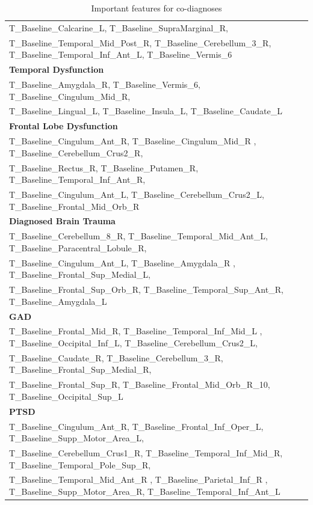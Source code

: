\documentclass[9pt]{article}
\begin{document}
\begin{table}[h!]
\begin{small}
\begin{tabular}{|l|}
 T\_Baseline\_Calcarine\_L,          T\_Baseline\_SupraMarginal\_R,\\     
T\_Baseline\_Temporal\_Mid\_Post\_R,  T\_Baseline\_Cerebellum\_3\_R,      
T\_Baseline\_Temporal\_Inf\_Ant\_L,   T\_Baseline\_Vermis\_6\\        \hline    
\textbf{ Temporal Dysfunction}\\\hline
 T\_Baseline\_Amygdala\_R,  T\_Baseline\_Vermis\_6,      
 T\_Baseline\_Cingulum\_Mid\_R,\\ T\_Baseline\_Lingual\_L, T\_Baseline\_Insula\_L, T\_Baseline\_Caudate\_L\\ \hline
\textbf{Frontal Lobe Dysfunction}\\\hline
 T\_Baseline\_Cingulum\_Ant\_R,    T\_Baseline\_Cingulum\_Mid\_R ,    T\_Baseline\_Cerebellum\_Crus2\_R,\\
 T\_Baseline\_Rectus\_R, T\_Baseline\_Putamen\_R,         
 T\_Baseline\_Temporal\_Inf\_Ant\_R,\\ T\_Baseline\_Cingulum\_Ant\_L,     T\_Baseline\_Cerebellum\_Crus2\_L,
 T\_Baseline\_Frontal\_Mid\_Orb\_R\\ \hline
\textbf{ Diagnosed Brain Trauma}\\ \hline
 T\_Baseline\_Cerebellum\_8\_R,      
 T\_Baseline\_Temporal\_Mid\_Ant\_L,   T\_Baseline\_Paracentral\_Lobule\_R,\\
 T\_Baseline\_Cingulum\_Ant\_L,       T\_Baseline\_Amygdala\_R ,         
T\_Baseline\_Frontal\_Sup\_Medial\_L,\\ T\_Baseline\_Frontal\_Sup\_Orb\_R,  
 T\_Baseline\_Temporal\_Sup\_Ant\_R,  T\_Baseline\_Amygdala\_L  \\\hline        
\textbf{GAD}\\\hline
T\_Baseline\_Frontal\_Mid\_R,        T\_Baseline\_Temporal\_Inf\_Mid\_L , 
 T\_Baseline\_Occipital\_Inf\_L,      T\_Baseline\_Cerebellum\_Crus2\_L,\\  
T\_Baseline\_Caudate\_R,            T\_Baseline\_Cerebellum\_3\_R,      
T\_Baseline\_Frontal\_Sup\_Medial\_R,\\ T\_Baseline\_Frontal\_Sup\_R,       
T\_Baseline\_Frontal\_Mid\_Orb\_R\_10, T\_Baseline\_Occipital\_Sup\_L\\  \hline   
\textbf{ PTSD}\\ \hline
T\_Baseline\_Cingulum\_Ant\_R,      T\_Baseline\_Frontal\_Inf\_Oper\_L, 
T\_Baseline\_Supp\_Motor\_Area\_L,\\   T\_Baseline\_Cerebellum\_Crus1\_R, 
 T\_Baseline\_Temporal\_Inf\_Mid\_R,  T\_Baseline\_Temporal\_Pole\_Sup\_R,\\
T\_Baseline\_Temporal\_Mid\_Ant\_R , T\_Baseline\_Parietal\_Inf\_R ,    
T\_Baseline\_Supp\_Motor\_Area\_R,   T\_Baseline\_Temporal\_Inf\_Ant\_L\\\hline

 \end{tabular}
\end{small}
	\caption{\footnotesize Important features for co-diagnoses}
\end{table}
\end{document}
